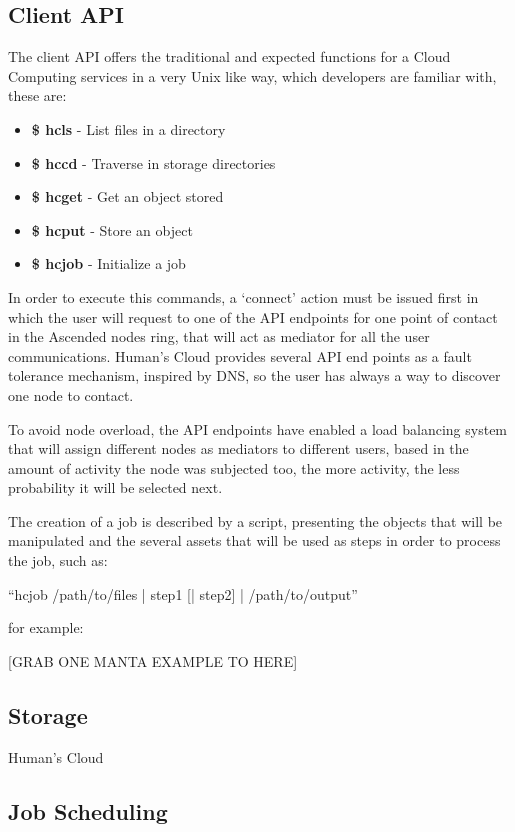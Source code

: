 \documentclass{./llncs2e/llncs}
\begin{document}
\subsection{Client API}

The client API offers the traditional and expected functions for a Cloud Computing services in a very Unix like way, which developers are familiar with, these are:

\begin{itemize}
   \item \textbf{\$ hcls}  - List files in a directory
   \item \textbf{\$ hccd}  - Traverse in storage directories   
   \item \textbf{\$ hcget} - Get an object stored
   \item \textbf{\$ hcput} - Store an object
   \item \textbf{\$ hcjob} - Initialize a job   
\end{itemize} 

In order to execute this commands, a `connect' action must be issued first in which the user will request to one of the API endpoints for one point of contact in the Ascended nodes ring, that will act as mediator for all the user communications. Human's Cloud provides several API end points as a fault tolerance mechanism, inspired by DNS, so the user has always a way to discover one node to contact.

To avoid node overload, the API endpoints have enabled a load balancing system that will assign different nodes as mediators to different users, based in the amount of activity the node was subjected too, the more activity, the less probability it will be selected next.

The creation of a job is described by a script, presenting the objects that will be manipulated and the several assets that will be used as steps in order to process the job, such as:

``hcjob /path/to/files | step1 [| step2] | /path/to/output''

for example:

[GRAB ONE MANTA EXAMPLE TO HERE]

\subsection{Storage}

Human's Cloud



\subsection{Job Scheduling}
\end{document}
